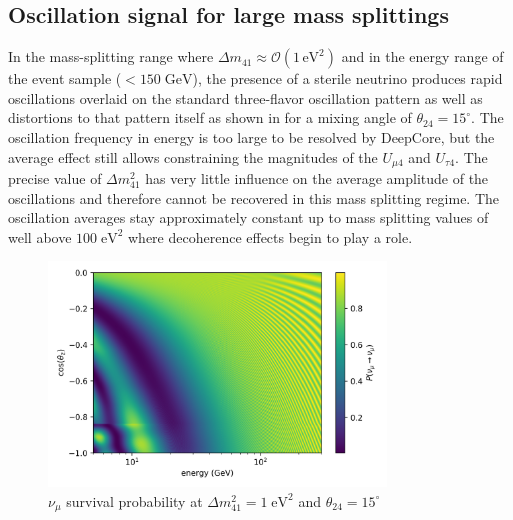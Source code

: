 \subsection{Oscillation signal for large mass splittings}
In the mass-splitting range where $\Delta m_{41}\approx\mathcal{O}(1\,\mathrm{eV^2})$ and in the energy range of the event sample ($<150\;\mathrm{GeV}$), the presence of a sterile neutrino produces rapid oscillations overlaid on the standard three-flavor oscillation pattern as well as distortions to that pattern itself as shown in  for a mixing angle of $\theta_{24}=15^\circ$. The oscillation frequency in energy is too large to be resolved by DeepCore, but the average effect still allows constraining the magnitudes of the $U_{\mu4}$ and $U_{\tau4}$. The precise value of $\Delta m^2_{41}$ has very little influence on the average amplitude of the oscillations and therefore cannot be recovered in this mass splitting regime. The oscillation averages stay approximately constant up to mass splitting values of well above $100\;\mathrm{eV^2}$ where decoherence effects begin to play a role\cite{atmo_decoherence}.
\begin{figure}
    \centering
    \includegraphics[width=0.8\textwidth]{figures/measurement/sterile_analysis/physics/dm41_1.0eV2_th24_15deg_avg_height_10-30km_ana_binning_range.png}
    \caption{$\nu_{\mu}$ survival probability at $\Delta m^2_{41}=1\;\mathrm{eV^2}$ and $\theta_{24}=15^\circ$}
    \label{fig:numu_survival_1eV2_analysis_binning_range}
\end{figure}


